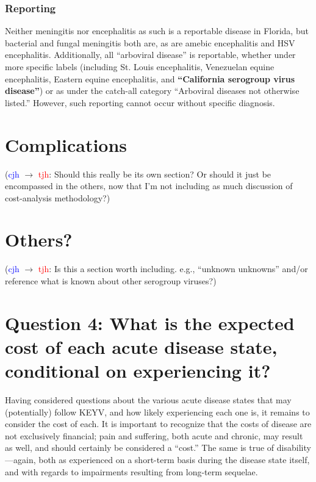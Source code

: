 \documentclass[12pt]{article}
\newcommand{\cjh}{\textcolor{blue}{cjh}}
\newcommand{\tjh}{\textcolor{red}{tjh}}
\newcommand{\msg}[3]{(#1 $\rightarrow$ #2: #3)}
\newcommand{\mcc}[1]{\msg\cjh\cjh{#1}}
\newcommand{\mct}[1]{\msg\cjh\tjh{#1}}
\newcommand{\mtc}[1]{\msg\tjh\cjh{#1}}
\begin{document}
        \subsubsection{Reporting}
            \label{reporting}
            Neither meningitis nor encephalitis as such is a reportable disease in Florida, but bacterial and fungal meningitis both are, as are amebic encephalitis and HSV encephalitis. Additionally, all ``arboviral disease'' is reportable, whether under more specific labels (including St. Louis encephalitis, Venezuelan equine encephalitis, Eastern equine encephalitis, and \textbf{``California serogroup virus disease''}) or as under the catch-all category ``Arboviral diseases not otherwise listed.'' However, such reporting cannot occur without specific diagnosis.

        \section{Complications}
            \mct{Should this really be its own section? Or should it just be encompassed in the others, now that I'm not including as much discussion of cost-analysis methodology?}

        \section{Others?}
            \mct{Is this a section worth including. e.g., ``unknown unknowns'' and/or reference what is known about other serogroup viruses?}

    \section[Expected costs, given diseases]{Question 4: What is the expected cost of each acute disease state, conditional on experiencing it?}
        \label{costs}
        Having considered questions about the various acute disease states that may (potentially) follow KEYV, and how likely experiencing each one is, it remains to consider the cost of each. It is important to recognize that the costs of disease are not exclusively financial; pain and suffering, both acute and chronic, may result as well, and should certainly be considered a ``cost.'' The same is true of disability---again, both as experienced on a short-term basis during the disease state itself, and with regards to impairments resulting from long-term sequelae.
\end{document}
